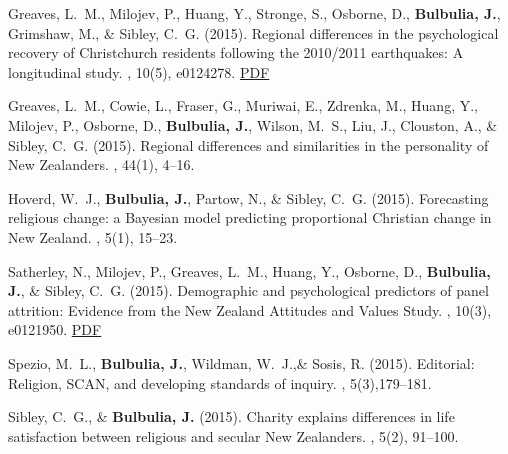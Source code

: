 \documentclass{article}
\begin{document}
\begin{thebibliography}{99}
Greaves, L.~M., Milojev, P., Huang, Y., Stronge, S., Osborne, D., {\bf Bulbulia, J.}, Grimshaw, M., \& Sibley, C.~G. (2015).
\newblock Regional differences in the psychological recovery of Christchurch residents following the 2010/2011 earthquakes: A longitudinal study.
, 10(5), e0124278. 
\href{https://www.dropbox.com/s/5rb1nqsw4eiks05/journal.pone.0124278.pdf?dl=0}{PDF} %


Greaves, L.~M., Cowie, L., Fraser, G., Muriwai, E., Zdrenka, M., Huang, Y., Milojev, P., Osborne, D., {\bf Bulbulia, J.}, Wilson, M.~S., Liu, J., Clouston, A., \& Sibley, C.~G. (2015).
\newblock Regional differences and similarities in the personality of {N}ew {Z}ealanders.
, 44(1), 4--16.


Hoverd, W.~J., {\bf Bulbulia, J.}, Partow, N., \& Sibley, C.~G. (2015).
\newblock Forecasting religious change: a Bayesian model predicting
  proportional Christian change in New Zealand.
, 5(1), 15--23. 


Satherley, N., Milojev, P., Greaves, L.~M., Huang, Y., Osborne, D., {\bf Bulbulia, J.}, \& Sibley, C.~G. (2015).
\newblock Demographic and psychological predictors of panel attrition: Evidence
  from the {N}ew {Z}ealand {A}ttitudes and {V}alues {S}tudy.
, 10(3), e0121950. 
\href{https://www.dropbox.com/s/t5j2oyalr97f5aj/journal.pone.0121950.pdf?dl=0}{PDF} %


Spezio, M.~L., {\bf Bulbulia, J.}, Wildman, W.~J.,\& Sosis, R. (2015). Editorial:
\newblock Religion, {SCAN}, and developing standards of inquiry.
, 5(3),179--181.
 

Sibley, C.~G., \& {\bf Bulbulia, J.} (2015).
\newblock Charity explains differences in life satisfaction between religious
  and secular New Zealanders.
, 5(2), 91--100.



\end{thebibliography}
\end{document}
